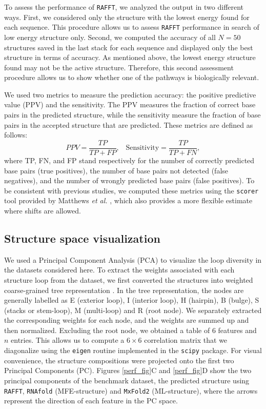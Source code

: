 To assess the performance of \texttt{RAFFT}, we analyzed the output in two different ways. First, we considered only the structure with the lowest energy found for each sequence. This procedure allows us to assess \texttt{RAFFT} performance in search of low energy structure only. Second, we computed the accuracy of all $N=50$ structures saved in the last stack for each sequence and displayed only the best structure in terms of accuracy. As mentioned above, the lowest energy structure found may not be the active structure. Therefore, this second assessment procedure allows us to show whether one of the pathways is biologically relevant.

We used two metrics to measure the prediction accuracy: the positive predictive value (PPV) and the sensitivity. The PPV measures the fraction of correct base pairs in the predicted structure, while the sensitivity measure the fraction of base pairs in the accepted structure that are predicted. These metrics are defined as follows:
\begin{equation}
PPV = \frac{TP}{TP + FP}, \;\;\; \text{Sensitivity} = \frac{TP}{TP+FN},
\end{equation}
where TP, FN, and FP stand respectively for the number of correctly predicted base pairs (true positives), the number of base pairs not detected (false negatives), and the number of wrongly predicted base pairs (false positives). To be consistent with previous studies, we computed these metrics using the \texttt{scorer} tool provided by Matthews \emph{et al.} \cite{mathews19_how_to_bench_rna_secon}, which also provides a more flexible estimate where shifts are allowed.

\subsection*{Structure space visualization}

We used a Principal Component Analysis (PCA) to visualize the loop diversity in the datasets considered here. To extract the weights associated with each structure loop from the dataset, we first converted the structures into weighted coarse-grained tree representation \cite{shapiro1990comparing}. In the tree representation, the nodes are generally labelled as E (exterior loop), I (interior loop), H (hairpin), B (bulge), S (stacks or stem-loop), M (multi-loop) and R (root node). We separately extracted the corresponding weights for each node, and the weights are summed up and then normalized. Excluding the root node, we obtained a table of $6$ features and \(n\) entries. This allows us to compute a \(6\times 6\) correlation matrix that we diagonalize using the \texttt{eigen} routine implemented in the \texttt{scipy} package. For visual convenience, the structure compositions were projected onto the first two Principal Components (PC). Figures \ref{perf_fig}C and \ref{perf_fig}D show the two principal components of the benchmark dataset, the predicted structure using \texttt{RAFFT}, \texttt{RNAfold} (MFE-structure) and \texttt{MxFold2} (ML-structure), where the arrows represent the direction of each feature in the PC space.


